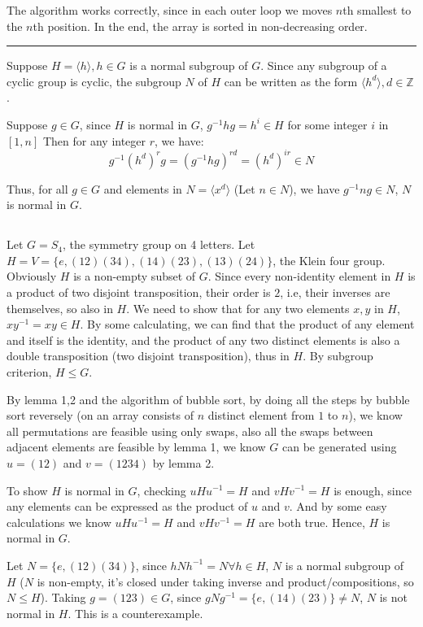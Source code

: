\documentclass[12pt]{article}
\begin{document}
The algorithm works correctly, since in each outer loop we moves $n$th smallest to the $n$th position. In the end, the array is sorted in non-decreasing order.

\noindent\rule{\textwidth}{1pt}

Suppose $H=\langle h\rangle,h\in G$ is a normal subgroup of $G$. Since any subgroup of a cyclic group is cyclic, the subgroup $N$ of $H$ can be written as the form $\langle h^d\rangle,d\in \mathbb{Z}$.

Suppose $g\in G$, since $H$ is normal in $G$, $g^{-1}hg=h^{i}\in H$ for some integer $i$ in $[1,n]$ Then for any integer $r$, we have:
$$g^{-1}(h^{d})^rg=(g^{-1}hg)^{rd}=(h^d)^{ir}\in N$$

Thus, for all $g\in G$ and elements in $N=\langle x^d\rangle$ (Let $n\in N$), we have $g^{-1}ng\in N$, $N$ is normal in $G$. 
\subsection{}

Let $G=S_4$, the symmetry group on 4 letters. Let $H=V=\{e,(12)(34),(14)(23),(13)(24)\}$, the Klein four group. Obviously $H$ is a non-empty subset of $G$. Since every non-identity element in $H$ is a product of two disjoint transposition, their order is $2$, i.e, their inverses are themselves, so also in $H$. We need to show that for any two elements $x,y$ in $H$, $xy^{-1}=xy\in H$. By some calculating, we can find that the product of any element and itself is the identity, and the product of any two distinct elements is also a double transposition (two disjoint transposition), thus in $H$. By subgroup criterion, $H\le G$.

By lemma 1,2 and the algorithm of bubble sort, by doing all the steps by bubble sort reversely (on an array consists of $n$ distinct element from $1$ to $n$), we know all permutations are feasible using only swaps, also all the swaps between adjacent elements are feasible by lemma 1, we know $G$ can be generated using $u=(12)$ and $v=(1234)$ by lemma 2. 

To show $H$ is normal in $G$, checking $uHu^{-1}=H$ and $vHv^{-1}=H$ is enough, since any elements can be expressed as the product of $u$ and $v$. And by some easy calculations we know $uHu^{-1}=H$ and $vHv^{-1}=H$ are both true. Hence, $H$ is normal in $G$.

Let $N=\{e, (12)(34)\}$, since $hNh^{-1}=N\forall h\in H$, $N$ is a normal subgroup of $H$ ($N$ is non-empty, it's closed under taking inverse and product/compositions, so $N\le H$). Taking $g=(123)\in G$, since $gNg^{-1}=\{e,(14)(23)\}\ne N$, $N$ is not normal in $H$. This is a counterexample.
\newpage
\end{document}
